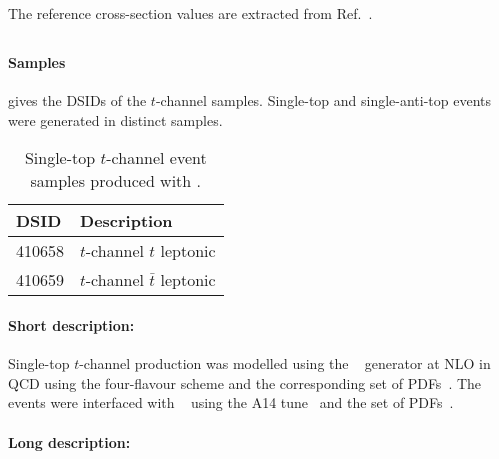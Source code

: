 The reference cross-section values are extracted from Ref.~\cite{LHCTopWGsgtopXsec}.


\subsection[Powheg+Pythia8]{\POWPY[8]}
\label{subsubsec:tchan_PP8}

\paragraph{Samples}

 gives the DSIDs of the \(t\)-channel \POWPY[8] samples.
Single-top and single-anti-top events were generated in distinct samples.

\begin{table}[!htbp]
  \caption{Single-top \(t\)-channel event samples produced with \POWPY[8].}%
  \label{tab:tchan_PP8}
  \centering
  \begin{tabular}{l l}
    \toprule
    DSID & Description \\
    \midrule
    410658 & \(t\)-channel \(t\) leptonic \\
    410659 & \(t\)-channel \(\bar{t}\) leptonic \\
    \bottomrule
  \end{tabular}
\end{table}

\paragraph{Short description:}

Single-top \(t\)-channel production was modelled using the
\POWHEGBOX[v2]~\cite{Frederix:2012dh,Nason:2004rx,Frixione:2007vw,Alioli:2010xd}
generator at NLO in QCD using the four-flavour scheme and the
corresponding \NNPDF[3.0nlo] set of PDFs~\cite{Ball:2014uwa}.  The events were
interfaced with \PYTHIA[8.230]~\cite{Sjostrand:2014zea} using the A14
tune~\cite{ATL-PHYS-PUB-2014-021} and the \NNPDF[2.3lo] set of
PDFs~\cite{Ball:2012cx}.




\paragraph{Long description:}


